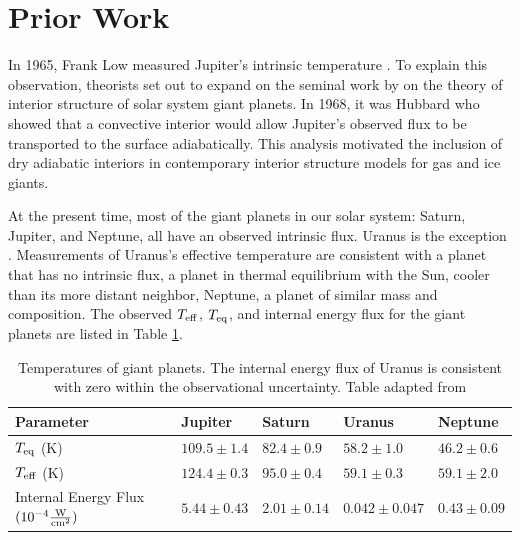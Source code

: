 \documentclass[11pt]{ucscthesisbs}
\begin{document}
\section{Prior Work}
In 1965, Frank Low measured Jupiter's intrinsic temperature \citep{low_1966}. To explain this observation, theorists \citep{hubbard_1968, smoluchowski_1967,hubbard_1977, hubbard_1977_2, podolak_1991} set out to expand on the seminal work by \citep{demarcus_1958} on the theory of interior structure of solar system giant planets. In 1968, it was Hubbard who showed that a convective interior would allow Jupiter's observed flux to be transported to the surface adiabatically. This analysis motivated the inclusion of dry adiabatic interiors in contemporary interior structure models for gas and ice giants.

At the present time, most of the giant planets in our solar system: Saturn, Jupiter, and Neptune, all have an observed intrinsic flux. Uranus is the exception \citep{pearl_conrath_1991}. Measurements of Uranus's effective temperature are consistent with a planet that has no intrinsic flux, a planet in thermal equilibrium with the Sun, cooler than its more distant neighbor, Neptune, a planet of similar mass and composition. The observed $T_{\rm eff}$, $T_{\rm eq}$, and internal energy flux for the giant planets are listed in Table \ref{tab:planetary_temperatures}.
\renewcommand{\arraystretch}{1.5}
\begin{table}[h]
\centering
\begin{tabular}{lllll}
Parameter                                                               & Jupiter                              & Saturn                               & Uranus                                 & Neptune                              \\ \hline
\multicolumn{1}{|l|}{$T_{\rm eq}$ (K)}                                  & \multicolumn{1}{l|}{$109.5 \pm 1.4$} & \multicolumn{1}{l|}{$82.4 \pm 0.9$}  & \multicolumn{1}{l|}{$58.2 \pm 1.0$}    & \multicolumn{1}{l|}{$46.2 \pm 0.6$}  \\ \hline
\multicolumn{1}{|l|}{$T_{\rm eff}$ (K)}                                 & \multicolumn{1}{l|}{$124.4 \pm 0.3$} & \multicolumn{1}{l|}{$95.0 \pm 0.4$}  & \multicolumn{1}{l|}{$59.1 \pm 0.3$}    & \multicolumn{1}{l|}{$59.1 \pm 2.0$}  \\ \hline
\multicolumn{1}{|l|}{Internal Energy Flux $(10^{-4} \frac{\rm W}{\rm cm^{2}})$} & \multicolumn{1}{l|}{$5.44 \pm 0.43$} & \multicolumn{1}{l|}{$2.01 \pm 0.14$} & \multicolumn{1}{l|}{$0.042 \pm 0.047$} & \multicolumn{1}{l|}{$0.43 \pm 0.09$}  \\ \hline
\end{tabular}
\caption{Temperatures of giant planets. The internal energy flux of Uranus is consistent with zero within the observational uncertainty. Table adapted from \citep{pearl_conrath_1991}}
\label{tab:planetary_temperatures}
\end{table}
\end{document}
